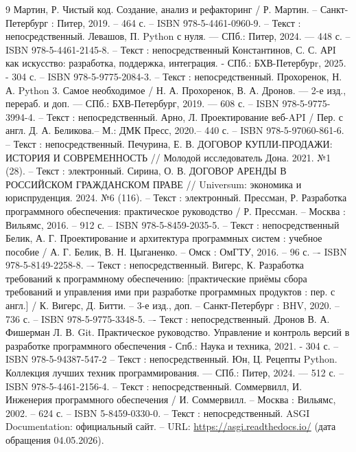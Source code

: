 \begin{thebibliography}{9}
     Мартин, Р. Чистый код. Создание, анализ и рефакторинг / Р. Мартин. – Санкт-Петербург : Питер, 2019. – 464 с. – ISBN 978-5-4461-0960-9. – Текст : непосредственный.
     Левашов, П. Python с нуля. — СПб.: Питер, 2024. — 448 с. – ISBN 978-5-4461-2145-8. – Текст : непосредственный
     Константинов, С. С. АРI как искусство: разработка, поддержка, интеграция. - СПб.: БХВ-Петербурr, 2025. - 304 с. – ISBN 978-5-9775-2084-3. – Текст : непосредственный.
     Прохоренок, Н. А. Python 3. Самое необходимое / Н. А. Прохоренок, В. А. Дронов. — 2-е изд., перераб. и доп. — СПб.: БХВ-Петербург, 2019. — 608 с. – ISBN 978-5-9775-3994-4. – Текст : непосредственный.
     Арно, Л. Проектирование веб-API / Пер. с англ. Д. А. Беликова.– М.: ДМК Пресс, 2020.– 440 с. – ISBN 978-5-97060-861-6. – Текст : непосредственный.
     Печурина, Е. В. ДОГОВОР КУПЛИ-ПРОДАЖИ: ИСТОРИЯ И СОВРЕМЕННОСТЬ // Молодой исследователь Дона. 2021. №1 (28). – Текст : электронный.
     Сирина, О. В. ДОГОВОР АРЕНДЫ В РОССИЙСКОМ ГРАЖДАНСКОМ ПРАВЕ // Universum: экономика и юриспруденция. 2024. №6 (116). – Текст : электронный.
     Прессман, Р. Разработка программного обеспечения: практическое руководство / Р. Прессман. – Москва : Вильямс, 2016. – 912 с. – ISBN 978-5-8459-2035-5. – Текст : непосредственный
     Белик, А. Г. Проектирование и архитектура программных систем : учебное пособие / А. Г. Белик, В. Н. Цыганенко. – Омск : ОмГТУ, 2016. – 96 с. –- ISBN 978-5-8149-2258-8. –- Текст : непосредственный.
     Вигерс, К. Разработка требований к программному обеспечению: [практические приёмы сбора требований и управления ими при разработке программных продуктов : пер. с англ.] / К. Вигерс, Д. Битти. – 3-е изд., доп. – Санкт-Петербург : BHV, 2020. – 736 с. – ISBN 978-5-9775-3348-5. –- Текст : непосредственный.
     Дронов В. А. Фишерман Л. В. Git. Практическое руководство. Управление и контроль версий в разработке программного обеспечения - Спб.: Наука и техника, 2021. - 304 с. – ISBN 978-5-94387-547-2 – Текст : непосредственный.
     Юн, Ц. Рецепты Python. Коллекция лучших техник программирования. — СПб.: Питер, 2024. — 512 с. – ISBN 978-5-4461-2156-4. – Текст : непосредственный.
     Соммервилл, И. Инженерия программного обеспечения / И. Соммервилл. – Москва : Вильямс, 2002. – 624 с. – ISBN 5-8459-0330-0. – Текст : непосредственный.
     ASGI Documentation: официальный сайт. – URL: \url{https://asgi.readthedocs.io/} (дата обращения 04.05.2026).

\end{thebibliography}
